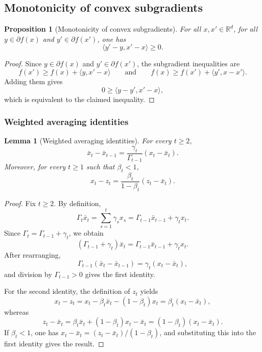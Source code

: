 \documentclass[11pt]{article}
\newtheorem{proposition}[theorem]{Proposition}
\newtheorem{lemma}[theorem]{Lemma}
\theoremstyle{definition}
\theoremstyle{remark}
\newcommand{\R}{\mathbb{R}}
\newcommand{\inner}[2]{\langle #1, #2 \rangle}
\begin{document}
\subsection{Monotonicity of convex subgradients}
\label{sec:monotonicity}

\begin{proposition}[Monotonicity of convex subgradients]
\label{prop:monotonicity}
For all $x,x' \in \R^d$, for all $y \in \partial f(x)$ and $y' \in \partial f(x')$, one has
\[
    \inner{y'-y}{x'-x} \ge 0.
\]
\end{proposition}

\begin{proof}
Since $y \in \partial f(x)$ and $y' \in \partial f(x')$, the subgradient inequalities are
\[
    f(x') \ge f(x) + \inner{y}{x'-x}
    \qquad\text{and}\qquad
    f(x) \ge f(x') + \inner{y'}{x-x'}.
\]
Adding them gives
\[
    0 \ge \inner{y-y'}{x'-x},
\]
which is equivalent to the claimed inequality.
\end{proof}

\subsubsection{Weighted averaging identities}
\label{sec:averaging}

\begin{lemma}[Weighted averaging identities]
\label{lem:averaging-identities}
For every $t\ge 2$,
\[
    \bar{x}_t - \bar{x}_{t-1} = \frac{\gamma_t}{\Gamma_{t-1}}(x_t-\bar{x}_t).
\]
Moreover, for every $t\ge 1$ such that $\beta_t<1$,
\[
    x_t-z_t = \frac{\beta_t}{1-\beta_t}(z_t-\bar{x}_t).
\]
\end{lemma}

\begin{proof}
Fix $t\ge 2$. By definition,
\[
    \Gamma_t \bar{x}_t
    =
    \sum_{s=1}^t \gamma_s x_s
    =
    \Gamma_{t-1}\bar{x}_{t-1} + \gamma_t x_t.
\]
Since $\Gamma_t = \Gamma_{t-1}+\gamma_t$, we obtain
\[
    (\Gamma_{t-1}+\gamma_t)\bar{x}_t
    =
    \Gamma_{t-1}\bar{x}_{t-1} + \gamma_t x_t.
\]
After rearranging,
\[
    \Gamma_{t-1}(\bar{x}_t-\bar{x}_{t-1}) = \gamma_t(x_t-\bar{x}_t),
\]
and division by $\Gamma_{t-1}>0$ gives the first identity.

For the second identity, the definition of $z_t$ yields
\[
    x_t-z_t = x_t-\beta_t\bar{x}_t-(1-\beta_t)x_t = \beta_t(x_t-\bar{x}_t),
\]
whereas
\[
    z_t-\bar{x}_t = \beta_t\bar{x}_t + (1-\beta_t)x_t-\bar{x}_t = (1-\beta_t)(x_t-\bar{x}_t).
\]
If $\beta_t<1$, one has $x_t-\bar{x}_t = (z_t-\bar{x}_t)/(1-\beta_t)$, and substituting this into the first identity gives the result.
\end{proof}
\end{document}
